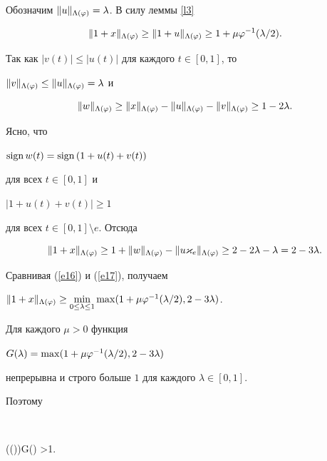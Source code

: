 Обозначим $\|u\|_{\Lambda (\varphi)} = \lambda$. В силу леммы \ref{l3}


\begin{equation}\label{e16}


\|1 + x\|_{\Lambda(\ph)} \ge \|1 + u\|_{\Lambda(\ph)} \ge 


1 + \mu \ph^{-1} ( \lambda/ 2). 


\end{equation} 


Так как $|v(t) | \le |u(t)|$ для каждого $t\in [0,1]$, то


$\|v\|_{\Lambda(\varphi)} \le \|u\|_{\Lambda(\varphi)} = \lambda$ и 


$$


\|w\|_{\Lambda (\ph)} \ge \|x\|_{\Lambda(\ph)} - \|u\|_{\Lambda(\ph)} 


- \|v\|_{\Lambda(\ph)} \ge 1 - 2\lambda. 


$$


Ясно, что


$\operatorname{sign} w(t) = \operatorname{sign} \left(1 + u(t) + v(t) \right)$


для всех $t\in [0,1]$ и


$|1 + u(t) + v(t) | \ge 1$


для всех $t\in [0,1] \setminus e$. Отсюда


\begin{equation}\label{e17}


\|1 + x\|_{\Lambda(\ph)} \ge 1 + \|w\|_{\Lambda(\ph)} - \|u \varkappa_e\|_{


\Lambda(\ph)} \ge 


2 - 2\lambda - \lambda = 2 - 3\lambda. 


\end{equation}


Сравнивая (\ref{e16}) и (\ref{e17}), получаем


$\|1 + x\|_{\Lambda(\ph)} \ge \minl{0\le\lambda \le 1} \max


( 1 + \mu \ph^{-1} ( \lambda/ 2), 2 -3\lambda)$.


Для каждого $\mu >0$ функция


$G(\lambda) = \max ( 1 + \mu \ph^{-1} ( \lambda/ 2), 


2 - 3\lambda)$


непрерывна и строго больше $1$ для каждого $\lambda \in[0,1]$. 


Поэтому 


$$


\gam (\Lambda (\ph))\ge {}G(\lambda) >1. \quad\square


